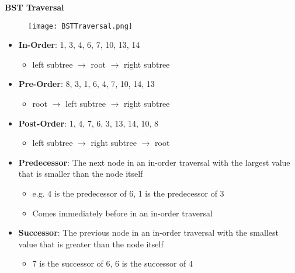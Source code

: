 \documentclass[10pt, 
a4paper, 
oneside, 
headinclude, footinclude, 
BCOR5mm]
{scrartcl}
\begin{document}
\textbf{BST Traversal}
\begin{figure}[H]
    \begin{center}
        \texttt{[image: BSTTraversal.png]}
    \end{center}
\end{figure}
\begin{itemize}
    \item \textbf{In-Order}: 1, 3, 4, 6, 7, 10, 13, 14
    \begin{itemize}
        \item left subtree $\rightarrow$ root $\rightarrow$ right subtree
    \end{itemize}
    \item \textbf{Pre-Order}: 8, 3, 1, 6, 4, 7, 10, 14, 13
    \begin{itemize}
        \item root $\rightarrow$ left subtree $\rightarrow$ right subtree
    \end{itemize}
    \item \textbf{Post-Order}: 1, 4, 7, 6, 3, 13, 14, 10, 8
    \begin{itemize}
        \item left subtree $\rightarrow$ right subtree $\rightarrow$ root
    \end{itemize}
    \item \textbf{Predecessor}: The next node in an in-order traversal with the largest value that is smaller than the node itself
    \begin{itemize}
        \item e.g. 4 is the predecessor of 6, 1 is the predecessor of 3
        \item Comes immediately before in an in-order traversal
    \end{itemize} 
    \item \textbf{Successor}: The previous node in an in-order traversal with the smallest value that is greater than the node itself
    \begin{itemize}
        \item 7 is the successor of 6, 6 is the successor of 4
    \end{itemize}
\end{itemize}
\end{document}
